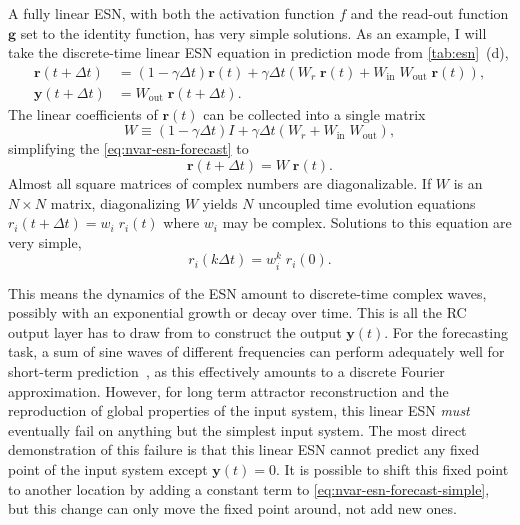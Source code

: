 A fully linear ESN, with both the activation function $f$ and the
read-out function $\bm{g}$ set to the identity function, has very
simple solutions. 
As an example, I will take the discrete-time linear
ESN equation in prediction mode from \cref{tab:esn}~(d),
\begin{align}
  \bm{r}(t + \Delta t) &= (1 - \gamma \Delta t) \bm{r}(t) + \gamma \Delta t \left( W_r\;\bm{r}(t) + W_\text{in}\;W_\text{out}\;\bm{r}(t)\right), \label{eq:nvar-esn-forecast} \\
  \bm{y}(t+\Delta t) &= W_\text{out}\;\bm{r}(t+\Delta t).
\end{align}
The linear coefficients of $\bm{r}(t)$ can be collected into a single matrix
\begin{equation}
  W \equiv (1 - \gamma \Delta t) I + \gamma \Delta t \left( W_r + W_\text{in}\;W_\text{out}\right),
\end{equation}
simplifying the \cref{eq:nvar-esn-forecast} to
\begin{equation}
  \bm{r}(t + \Delta t) = W\;\bm{r}(t).
  \label{eq:nvar-esn-forecast-simple}
\end{equation}
Almost all square matrices of complex numbers are diagonalizable. If
$W$ is an $N \times N$ matrix, diagonalizing $W$ yields $N$
uncoupled time evolution equations $r_i(t + \Delta t) = w_i\;
r_i(t)$ where $w_i$ may be complex. Solutions to this equation are very simple,
\begin{equation}
  r_i(k \Delta t) = w_i^k\; r_i(0).
\end{equation}

This means the dynamics of the ESN amount to discrete-time complex
waves, possibly with an exponential growth or decay over time. This is
all the RC output layer has to draw from to construct the output
$\bm{y}(t)$. For the forecasting task, a sum of sine waves of
different frequencies can perform adequately well for short-term
prediction~\cite{bollt2021}, as this effectively amounts to a discrete
Fourier approximation. However, for long term attractor reconstruction
and the reproduction of global properties of the input system, this
linear ESN \emph{must} eventually fail on anything but the simplest
input system. The most direct demonstration of this failure is that
this linear ESN cannot predict any fixed point of the input system
except $\bm{y}(t) = 0$. It is possible to shift this fixed point to
another location by adding a constant term to
\cref{eq:nvar-esn-forecast-simple}, but this change can only move the
fixed point around, not add new ones.

